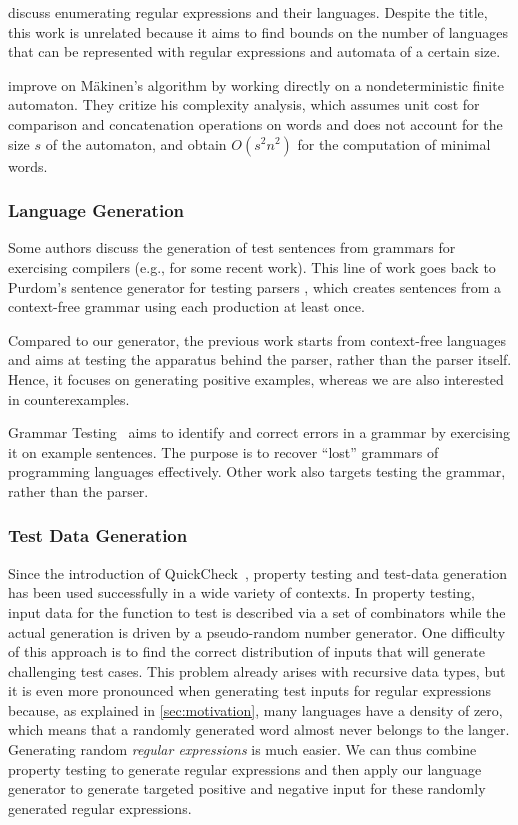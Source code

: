 \citet{DBLP:conf/wia/LeeS04} discuss enumerating regular expressions
and their languages. Despite the title, this work is unrelated
because it aims to find bounds on the number of languages that can be
represented with regular expressions and automata of a certain size.

\citet{DBLP:journals/tcs/AckermanS09} improve on M{\"{a}}kinen's
algorithm by working directly on a nondeterministic finite
automaton. They critize his complexity analysis, which assumes unit
cost for comparison and concatenation operations on words and does not
account for the size $s$ of the automaton, and obtain $O (s^2n^2)$ for
the computation of minimal words.


\subsubsection*{Language Generation}
Some authors discuss the generation of test sentences from grammars for
exercising compilers
(e.g., \cite{DBLP:conf/cisse/ParachaF08,DBLP:conf/compsac/ZhengW09}
for some recent work). This
line of work goes back to Purdom's sentence generator for testing
parsers \cite{purdom72:_senten_gener_testin_parser}, which creates
sentences from a context-free grammar using each production at least
once.

Compared to our generator, the previous work starts from context-free
languages and aims at testing the apparatus behind the parser,
rather than the parser itself. Hence, it focuses on generating
positive examples, whereas we are also interested in counterexamples.

Grammar Testing~\cite{DBLP:conf/fase/Lammel01} aims to
identify and correct errors in a grammar by exercising it on example
sentences. The purpose is to recover ``lost'' grammars of programming
languages effectively.
Other work \cite{DBLP:conf/compsac/LiJLG04} also targets
testing the grammar, rather than the parser.

\subsubsection*{Test Data Generation}

Since the introduction of
QuickCheck~\cite{DBLP:conf/icfp/ClaessenH00}, property testing and
test-data generation has been used successfully in a wide variety of
contexts.  In property testing, input data for the function to test is
described via a set of combinators while the actual generation is
driven by a pseudo-random number generator. One difficulty of this
approach is to find the correct distribution of inputs that will
generate challenging test cases. This problem already arises with
recursive data types, but it is even more pronounced when generating
test inputs for regular expressions because, as explained in
\cref{sec:motivation}, many languages have a density of zero, which
means that a randomly generated word almost never belongs to the
langer.  Generating random \emph{regular expressions} is much
easier. We can thus combine property testing to generate regular
expressions and then apply our language generator to generate targeted
positive and negative input for these randomly generated regular
expressions.

